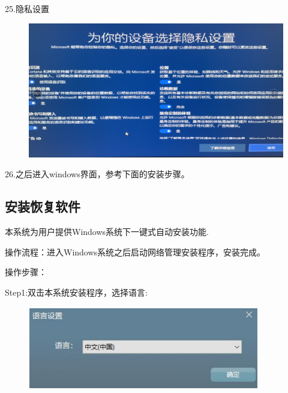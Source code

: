 \documentclass[openbib]{article}
\begin{document}
25.隐私设置
\begin{figure}[htbp]
	\centering
	\includegraphics[scale=0.24]{24}
\end{figure}

26.之后进入windows界面，参考下面的安装步骤。
\subsection{安装恢复软件}

本系统为用户提供Windows系统下一键式自动安装功能.

操作流程：进入Windows系统之后启动网络管理安装程序，安装完成。

操作步骤：

Step1:双击本系统安装程序，选择语言:
\begin{figure}[H]
	\centering
	\includegraphics[scale=0.3]{语言设置}
\end{figure}
\end{document}
